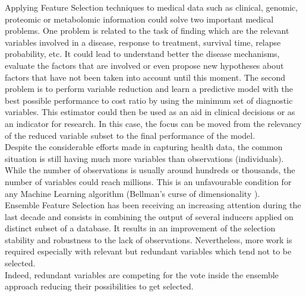 Applying Feature Selection techniques to medical data such as clinical, genomic, proteomic or metabolomic information could solve two important medical problems. One problem is related to the task of finding which are the relevant variables involved in a disease, response to treatment, survival time, relapse probability, etc. It could lead to understand better the disease mechanisms, evaluate the factors that are involved or even propose new hypotheses about factors that have not been taken into account until this moment. The second problem is to perform variable reduction and learn a predictive model with the best possible performance to cost ratio by using the minimum set of diagnostic variables. This estimator could then be used as an aid in clinical decisions or as an indicator for research. In this case, the focus can be moved from the relevancy of the reduced variable subset to the final performance of the model. 
\\

Despite the considerable efforts made in capturing health data, the common situation is still having much more variables than observations (individuals). While the number of observations is usually around hundreds or thousands, the number of variables could reach millions. This is an unfavourable condition for any Machine Learning algorithm (Bellman's curse of dimensionality \cite{Bellman2015AdaptiveTour}). 
\\

Ensemble Feature Selection has been receiving an increasing attention during the last decade \cite{Bolon-Canedo2019EnsemblesTrends} \cite{Pes2020EnsembleDomains} \cite{Abeel2009RobustMethods} \cite{BenBrahim2017EnsembleStudy} and consists in combining the output of several inducers applied on distinct subset of a database. It results in an improvement of the selection stability and robustness to the lack of observations. Nevertheless, more work is required especially with relevant but redundant variables which tend not to be selected. 
\\

Indeed, redundant variables are competing for the vote inside the ensemble approach reducing their possibilities to get selected.
\\

